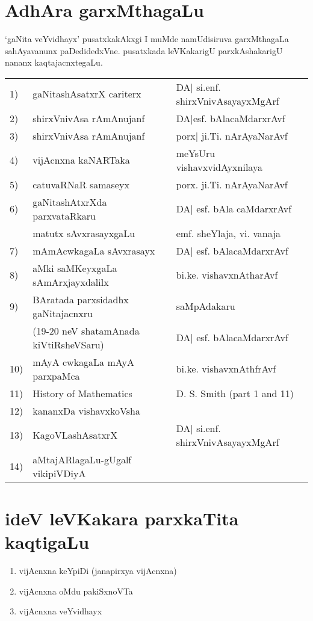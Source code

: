 {\section*{AdhAra garxMthagaLu}

`gaNita veYvidhayx' pusatxkakAkxgi I muMde namUdisiruva garxMthagaLa sahAyavanunx paDedidedxVne. pusatxkada leVKakarigU parxkAshakarigU nananx kaqtajacnxtegaLu.

\begin{longtable}{l>{\raggedright}p{4cm}>{\raggedright}p{4cm}}
{\rm 1)} &  gaNitashAsatxrX cariterx & DA| si.enf. shirxVnivAsayayxMgArf \tabularnewline
{\rm 2)} & shirxVnivAsa rAmAnujanf & DA|esf. bAlacaMdarxrAvf\tabularnewline
{\rm 3)} & shirxVnivAsa rAmAnujanf & porx| ji.Ti. nArAyaNarAvf\tabularnewline
{\rm 4)} & vijAcnxna kaNARTaka & meYsUru vishavxvidAyxnilaya\tabularnewline
{\rm 5)} & catuvaRNaR samaseyx & porx. ji.Ti. nArAyaNarAvf\tabularnewline
{\rm 6)} & gaNitashAtxrXda parxvataRkaru & DA| esf. bAla caMdarxrAvf\tabularnewline[-0.1cm]
& matutx sAvxrasayxgaLu & emf. sheYlaja, vi. vanaja\tabularnewline
{\rm 7)} & mAmAcwkagaLa sAvxrasayx & DA| esf. bAlacaMdarxrAvf\tabularnewline
{\rm 8)} & aMki saMKeyxgaLa sAmArxjayxdalilx & bi.ke. vishavxnAtharAvf\tabularnewline
{\rm 9)} & BAratada parxsidadhx gaNitajacnxru  & saMpAdakaru \tabularnewline[-0.1cm]
& ({\rm 19-20} neV shatamAnada kiVtiRsheVSaru) & DA| esf. bAlacaMdarxrAvf\tabularnewline
{\rm 10)} & mAyA cwkagaLa mAyA parxpaMca & bi.ke. vishavxnAthfrAvf\tabularnewline
{\rm 11)} & {\rm History of Mathematics} & {\rm D. S. Smith (part 1 and 11)}\tabularnewline[-0.1cm]
{\rm 12)} & kananxDa vishavxkoVsha &\tabularnewline
{\rm 13)} & KagoVLashAsatxrX & DA| si.enf. shirxVnivAsayayxMgArf\tabularnewline
{\rm 14)} & aMtajARlagaLu-gUgalf vikipiVDiyA & \tabularnewline
\end{longtable}

\section*{ideV leVKakara parxkaTita kaqtigaLu}

\begin{enumerate}
\item vijAcnxna keYpiDi (janapirxya vijAcnxna)

\item vijAcnxna oMdu pakiSxnoVTa

\item vijAcnxna veYvidhayx


\end{enumerate}}
